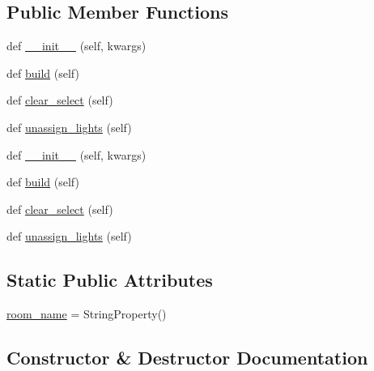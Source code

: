 \subsection*{Public Member Functions}
\begin{DoxyCompactItemize}
\item 
def \hyperlink{classGUI8_1_1RoomView_a56a12e93ac665ca3d73291cc02a97ba2}{\+\_\+\+\_\+init\+\_\+\+\_\+} (self, kwargs)
\item 
def \hyperlink{classGUI8_1_1RoomView_a361365528c93e71bfaeccaed56418c4b}{build} (self)
\item 
def \hyperlink{classGUI8_1_1RoomView_a815a4cc44e55b00a30bec9ffbe0bee49}{clear\+\_\+select} (self)
\item 
def \hyperlink{classGUI8_1_1RoomView_a630d459430150058c291ce7fe98d3189}{unassign\+\_\+lights} (self)
\item 
def \hyperlink{classGUI8_1_1RoomView_a56a12e93ac665ca3d73291cc02a97ba2}{\+\_\+\+\_\+init\+\_\+\+\_\+} (self, kwargs)
\item 
def \hyperlink{classGUI8_1_1RoomView_a361365528c93e71bfaeccaed56418c4b}{build} (self)
\item 
def \hyperlink{classGUI8_1_1RoomView_a815a4cc44e55b00a30bec9ffbe0bee49}{clear\+\_\+select} (self)
\item 
def \hyperlink{classGUI8_1_1RoomView_a630d459430150058c291ce7fe98d3189}{unassign\+\_\+lights} (self)
\end{DoxyCompactItemize}
\subsection*{Static Public Attributes}
\begin{DoxyCompactItemize}
\item 
\hyperlink{classGUI8_1_1RoomView_a7a21e7172aca962bbb54f259ac765d7d}{room\+\_\+name} = String\+Property()
\end{DoxyCompactItemize}


\subsection{Constructor \& Destructor Documentation}
